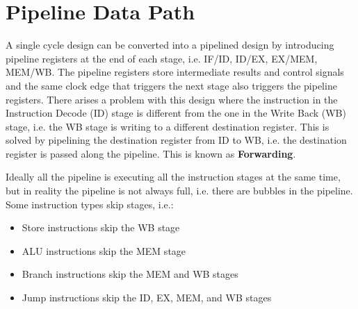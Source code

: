 \documentclass[12pt letter]{report}
\begin{document}

\section{Pipeline Data Path}

A single cycle design can be converted into a pipelined design by introducing pipeline registers at the end of each stage, i.e. IF/ID, ID/EX, EX/MEM, MEM/WB.
The pipeline registers store intermediate results and control signals and the same clock edge that triggers the next stage also triggers the pipeline registers.
There arises a problem with this design where the instruction in the Instruction Decode (ID) stage is different from the one in the Write Back (WB) stage, i.e.
the WB stage is writing to a different destination register. This is solved by pipelining the destination register from ID to WB, i.e. the destination register
is passed along the pipeline. This is known as \textbf{Forwarding}.

Ideally all the pipeline is executing all the instruction stages at the same time, but in reality the pipeline is not always full, i.e. there are bubbles in the pipeline.
Some instruction types skip stages, i.e.:
\begin{itemize}
  \item Store instructions skip the WB stage
  \item ALU instructions skip the MEM stage
  \item Branch instructions skip the MEM and WB stages
  \item Jump instructions skip the ID, EX, MEM, and WB stages
\end{itemize}
\end{document}
